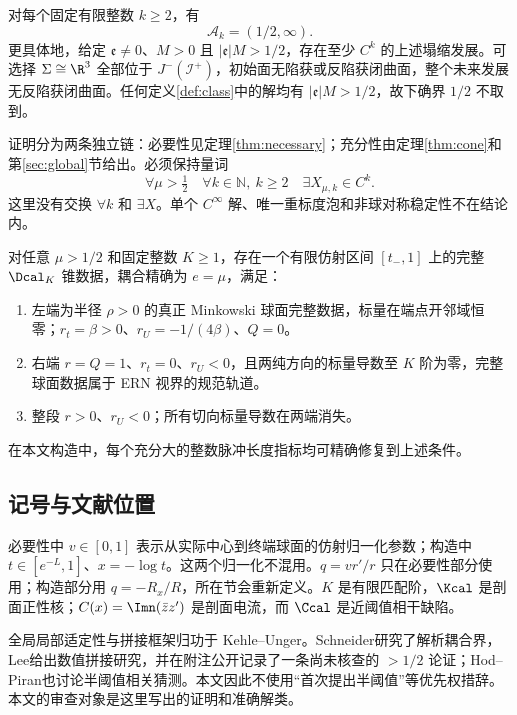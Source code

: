 \begin{theorem}[有限阶尖锐参数范围]\label{thm:main}
对每个固定有限整数 $k\ge2$，有
\begin{equation}\label{eq:sharp}
\mathscr A_k=(1/2,\infty).
\end{equation}
更具体地，给定 $\mathfrak e\ne0$、$M>0$ 且 $|\mathfrak e|M>1/2$，存在至少 $C^k$ 的上述塌缩发展。可选择 $\Sigma\cong\R^3$ 全部位于 $J^-(\mathcal I^+)$，初始面无陷获或反陷获闭曲面，整个未来发展无反陷获闭曲面。任何定义\ref{def:class}中的解均有 $|\mathfrak e|M>1/2$，故下确界 $1/2$ 不取到。
\end{theorem}
证明分为两条独立链：必要性见定理\ref{thm:necessary}；充分性由定理\ref{thm:cone}和第\ref{sec:global}节给出。必须保持量词
\[
\forall\mu>\tfrac12\quad\forall k\in\mathbb N,\ k\ge2
\quad\exists X_{\mu,k}\in C^k.
\]
这里没有交换 $\forall k$ 和 $\exists X$。单个 $C^\infty$ 解、唯一重标度泡和非球对称稳定性不在结论内。

\begin{theorem}[指定耦合的完整有限阶连接锥]\label{thm:cone}
对任意 $\mu>1/2$ 和固定整数 $K\ge1$，存在一个有限仿射区间 $[t_-,1]$ 上的完整 $\Dcal_K$ 锥数据，耦合精确为 $e=\mu$，满足：
\begin{enumerate}
\item 左端为半径 $\rho>0$ 的真正 Minkowski 球面完整数据，标量在端点开邻域恒零；$r_t=\beta>0$、$r_U=-1/(4\beta)$、$Q=0$。
\item 右端 $r=Q=1$、$r_t=0$、$r_U<0$，且两纯方向的标量导数至 $K$ 阶为零，完整球面数据属于 ERN 视界的规范轨道。
\item 整段 $r>0$、$r_U<0$；所有切向标量导数在两端消失。
\end{enumerate}
在本文构造中，每个充分大的整数脉冲长度指标均可精确修复到上述条件。
\end{theorem}

\subsection{记号与文献位置}
必要性中 $v\in[0,1]$ 表示从实际中心到终端球面的仿射归一化参数；构造中 $t\in[e^{-L},1]$、$x=-\log t$。这两个归一化不混用。$q=vr'/r$ 只在必要性部分使用；构造部分用 $q=-R_x/R$，所在节会重新定义。$K$ 是有限匹配阶，$\Kcal$ 是剖面正性核；$C(x)=\Imn(\bar z z')$ 是剖面电流，而 $\Ccal$ 是近阈值相干缺陷。

全局局部适定性与拼接框架归功于 Kehle--Unger\cite{KU}。Schneider\cite{S}研究了解析耦合界，Lee\cite{L}给出数值拼接研究，并在附注公开记录了一条尚未核查的 $>1/2$ 论证；Hod--Piran\cite{HP}也讨论半阈值相关猜测。本文因此不使用“首次提出半阈值”等优先权措辞。本文的审查对象是这里写出的证明和准确解类。
